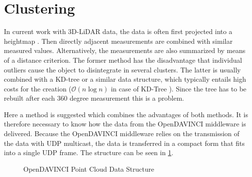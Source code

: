 \documentclass[11pt,oneside,openright]{mpreport}
\begin{document}
\section{Clustering}
In current work with 3D-LiDAR data, the data is often first projected into a heightmap \cite{Zhang,Himmelsbach2009,Li2016}. Then directly adjacent measurements are combined with similar measured values.
Alternatively, the measurements are also summarized by means of a distance criterion. 
The former method has the disadvantage that individual outliers cause the object to disintegrate in several clusters.
The latter is usually combined with a KD-tree or a similar data structure, which typically entails high costs for the creation ($\mathcal{O}(n\log n)$ in case of KD-Tree \cite{Bentley1975}).
Since the tree has to be rebuilt after each 360 degree measurement this is a problem.

Here a method is suggested which combines the advantages of both methods. It is therefore necessary to know how the data from the OpenDAVINCI
middleware is delivered. Because the OpenDAVINCI middleware relies on the transmission of the data with UDP multicast, the data is transferred in a 
compact form that fits into a single UDP frame. The structure can be seen in \cref{odv_ds}.

\begin{figure}[!ht]
\caption{OpenDAVINCI Point Cloud Data Structure}
  \begin{center}
  \end{center}
\label{odv_ds}
\end{figure}
\end{document}
